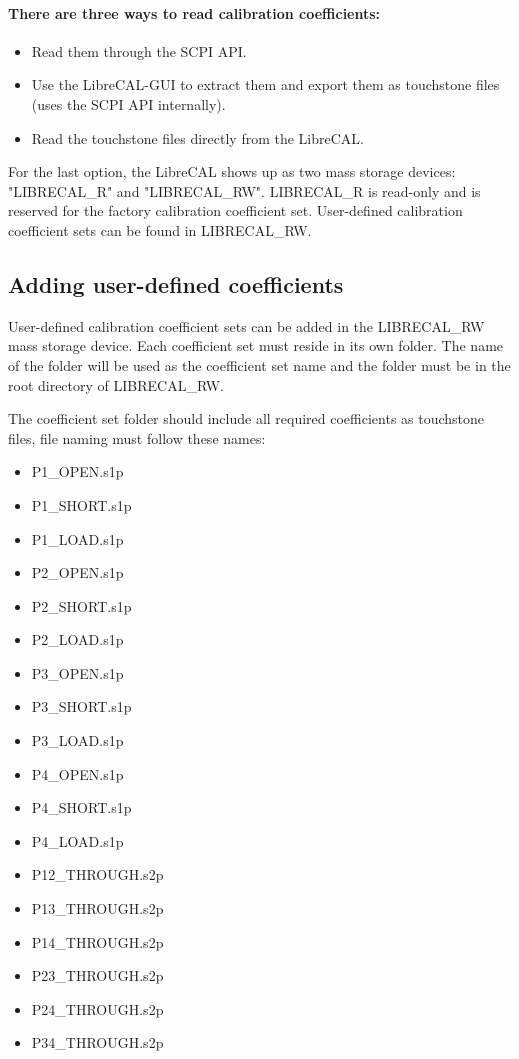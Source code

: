 \documentclass[a4paper,11pt]{article}
\newcommand{\dev}{LibreCAL}
\begin{document}
\paragraph{There are three ways to read calibration coefficients:}
\begin{itemize}
\item Read them through the SCPI API.
\item Use the \dev{}-GUI to extract them and export them as touchstone files (uses the SCPI API internally).
\item Read the touchstone files directly from the \dev{}.
\end{itemize}

For the last option, the \dev{} shows up as two mass storage devices: "\mbox{LIBRECAL\_R}" and "\mbox{LIBRECAL\_R}W". \mbox{LIBRECAL\_R} is read-only and is reserved for the factory calibration coefficient set. User-defined calibration coefficient sets can be found in \mbox{LIBRECAL\_R}W. 

\subsection{Adding user-defined coefficients}
User-defined calibration coefficient sets can be added in the \mbox{LIBRECAL\_R}W mass storage device. Each coefficient set must reside in its own folder. The name of the folder will be used as the coefficient set name and the folder must be in the root directory of \mbox{LIBRECAL\_R}W.

The coefficient set folder should include all required coefficients as touchstone files, file naming must follow these names:
\begin{itemize}
\item P1\_OPEN.s1p
\item P1\_SHORT.s1p
\item P1\_LOAD.s1p
\item P2\_OPEN.s1p
\item P2\_SHORT.s1p
\item P2\_LOAD.s1p
\item P3\_OPEN.s1p
\item P3\_SHORT.s1p
\item P3\_LOAD.s1p
\item P4\_OPEN.s1p
\item P4\_SHORT.s1p
\item P4\_LOAD.s1p
\item P12\_THROUGH.s2p
\item P13\_THROUGH.s2p
\item P14\_THROUGH.s2p
\item P23\_THROUGH.s2p
\item P24\_THROUGH.s2p
\item P34\_THROUGH.s2p
\end{itemize}
\end{document}
